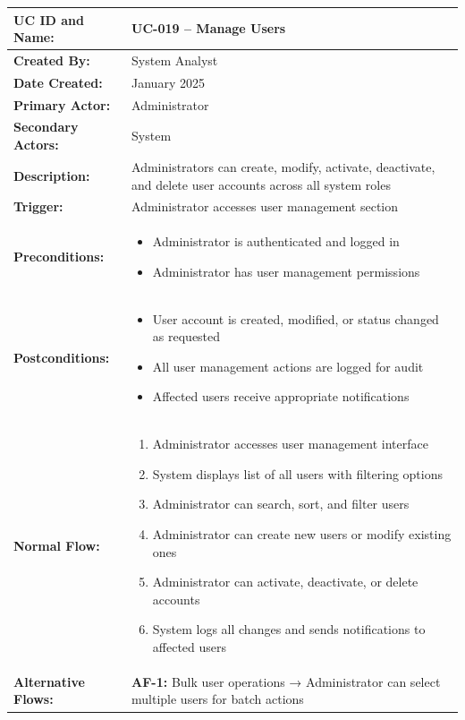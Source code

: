 \documentclass[12pt,a4paper]{article}
\begin{document}
\renewcommand{\arraystretch}{1.5}
\begin{longtable}{|p{4.5cm}|p{10.5cm}|}
\hline
\textbf{UC ID and Name:} & UC-019 – Manage Users \\
\hline
\textbf{Created By:} & System Analyst \\
\hline
\textbf{Date Created:} & January 2025 \\
\hline
\textbf{Primary Actor:} & Administrator \\
\hline
\textbf{Secondary Actors:} & System \\
\hline
\textbf{Description:} & Administrators can create, modify, activate, deactivate, and delete user accounts across all system roles \\
\hline
\textbf{Trigger:} & Administrator accesses user management section \\
\hline
\textbf{Preconditions:} &
\begin{itemize}
  \item Administrator is authenticated and logged in
  \item Administrator has user management permissions
\end{itemize} \\
\hline
\textbf{Postconditions:} &
\begin{itemize}
  \item User account is created, modified, or status changed as requested
  \item All user management actions are logged for audit
  \item Affected users receive appropriate notifications
\end{itemize} \\
\hline
\textbf{Normal Flow:} &
\begin{enumerate}
  \item Administrator accesses user management interface
  \item System displays list of all users with filtering options
  \item Administrator can search, sort, and filter users
  \item Administrator can create new users or modify existing ones
  \item Administrator can activate, deactivate, or delete accounts
  \item System logs all changes and sends notifications to affected users
\end{enumerate} \\
\hline
\textbf{Alternative Flows:} &
\textbf{AF-1:} Bulk user operations → Administrator can select multiple users for batch actions \\

\end{longtable}
\end{document}

